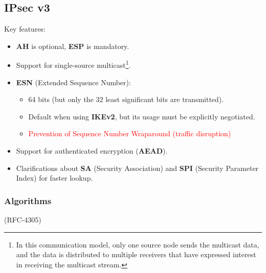 \subsection{IPsec v3}
Key features:
\begin{itemize}
    \item \textbf{AH} is optional, \textbf{ESP} is mandatory.
    \item Support for single-source multicast\footnote{In this communication model, only one source node sends the multicast data, and the data is distributed to multiple receivers that have expressed interest in receiving the multicast stream.}.
    \item \textbf{ESN} (Extended Sequence Number):
    \begin{itemize}
        \item 64 bits (but only the 32 least significant bits are transmitted).
        \item Default when using \textbf{IKEv2}, but its usage must be explicitly negotiated.
        \item \textcolor{red}{Prevention of Sequence Number Wraparound (traffic disruption)}
    \end{itemize}
    \item Support for authenticated encryption (\textbf{AEAD}).
    \item Clarifications about \textbf{SA} (Security Association) and \textbf{SPI} (Security Parameter Index) for faster lookup.
\end{itemize}

\subsubsection{Algorithms}
\begin{center}
    (RFC-4305)
\end{center}

